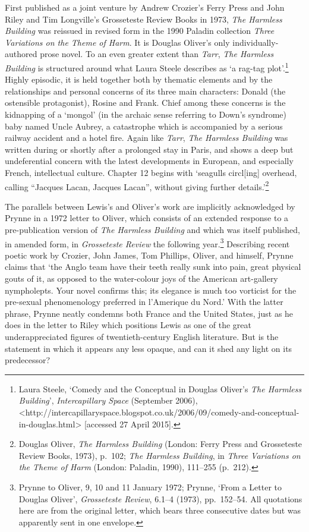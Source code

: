 \documentclass[]{article}
\begin{document}
First published as a joint venture by Andrew Crozier’s Ferry Press and
John Riley and Tim Longville’s Grosseteste Review Books in 1973,
\emph{The Harmless Building} was reissued in revised form in the 1990
Paladin collection \emph{Three Variations on the Theme of Harm}. It is
Douglas Oliver’s only individually-authored prose novel. To an even
greater extent than \emph{Tarr}, \emph{The Harmless Building} is
structured around what Laura Steele describes as ‘a rag-tag
plot’.\footnote{Laura Steele, ‘Comedy and the Conceptual in Douglas
  Oliver’s \emph{The Harmless Building}’, \emph{Intercapillary Space}
  (September 2006),
  \textless{}http://intercapillaryspace.blogspot.co.uk/2006/09/comedy-and-conceptual-in-douglas.html\textgreater{}
  {[}accessed 27 April 2015{]}.} Highly episodic, it is held together
both by thematic elements and by the relationships and personal concerns
of its three main characters: Donald (the ostensible protagonist),
Rosine and Frank. Chief among these concerns is the kidnapping of a
‘mongol’ (in the archaic sense referring to Down’s syndrome) baby named
Uncle Aubrey, a catastrophe which is accompanied by a serious railway
accident and a hotel fire. Again like \emph{Tarr}, \emph{The Harmless
Building} was written during or shortly after a prolonged stay in Paris,
and shows a deep but undeferential concern with the latest developments
in European, and especially French, intellectual culture. Chapter 12
begins with ‘seagulls circl{[}ing{]} overhead, calling “Jacques Lacan,
Jacques Lacan”, without giving further details.’\footnote{Douglas
  Oliver, \emph{The Harmless Building} (London: Ferry Press and
  Grosseteste Review Books, 1973), p.~102; \emph{The Harmless Building},
  in \emph{Three Variations on the Theme of Harm} (London: Paladin,
  1990), 111–255 (p.~212).}

The parallels between Lewis’s and Oliver’s work are implicitly
acknowledged by Prynne in a 1972 letter to Oliver, which consists of an
extended response to a pre-publication version of \emph{The Harmless
Building} and which was itself published, in amended form, in
\emph{Grosseteste Review} the following year.\footnote{Prynne to Oliver,
  9, 10 and 11 January 1972; Prynne, ‘From a Letter to Douglas Oliver’,
  \emph{Grosseteste Review}, 6.1–4 (1973), pp.~152–54. All quotations
  here are from the original letter, which bears three consecutive dates
  but was apparently sent in one envelope.} Describing recent poetic
work by Crozier, John James, Tom Phillips, Oliver, and himself, Prynne
claims that ‘the Anglo team have their teeth really sunk into pain,
great physical gouts of it, as opposed to the water-colour joys of the
American art-gallery nympholepts. Your novel confirms this; its elegance
is much too vorticist for the pre-sexual phenomenology preferred in
l’Amerique du Nord.’ With the latter phrase, Prynne neatly condemns both
France and the United States, just as he does in the letter to Riley
which positions Lewis as one of the great underappreciated figures of
twentieth-century English literature. But is the statement in which it
appears any less opaque, and can it shed any light on its predecessor?
\end{document}
